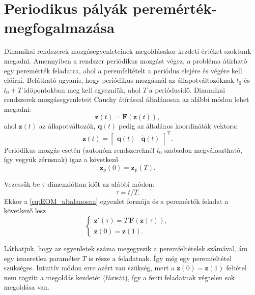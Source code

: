 


\section{Periodikus pályák peremérték-megfogalmazása}
\label{sec:per_palya_perem_megfog}

Dinamikai rendszerek mozgásegyenleteinek megoldásakor kezdeti értéket szoktunk megadni.
Amennyiben a rendszer periódikus mozgást végez, a probléma átírható egy peremérték feladatra, ahol a peremfeltételt a periódus elejére és végére kell előírni.
Belátható ugyanis, hogy periódikus mozgásnál az állapotváltozóknak $t_0$ és $t_0 + T$ időpontokban meg kell egyezniük, ahol $T$ a periódusidő.
Dinamikai rendszerek mozgásegyenleteit Cauchy átírással általánosan az alábbi módon lehet megadni:
\begin{equation}
\dot{\mathbf{z}}(t) = \mathbf{F}(\mathbf{z}(t)),
\label{eq:EOM_altalanosan}
\end{equation}
ahol $\mathbf{z}(t)$ az állapotváltozók, $\mathbf{q}(t)$ pedig az általános koordináták vektora:
\begin{equation}
\mathbf{z}(t) = \begin{bmatrix}
\mathbf{q}(t) & \dot{\mathbf{q}}(t)
\end{bmatrix}^\mathrm{T}.
\end{equation}
Periódikus mozgás esetén (autonóm rendszereknél $t_0$ szabadon megválasztható, így vegyük zérusnak) igaz a következő
\begin{equation}
\mathbf{z}_\mathrm{p}(0) = \mathbf{z}_\mathrm{p}(T) .
\end{equation}

Vezessük be $\tau$ dimenziótlan időt az alábbi módon:
\begin{equation}
\tau =  t/T.
\end{equation}
Ekkor a \eqref{eq:EOM_altalanosan} egyenlet formája és a peremérték feladat a következő lesz
\begin{equation}
\begin{cases}
\mathbf{z}'(\tau) = T\,\mathbf{F}(\mathbf{z}(\tau)), \\
\mathbf{z}(0) = \mathbf{z}(1).
\end{cases}
\label{eq:EOM_dimtalan}
\end{equation}

Láthatjuk, hogy az egyenletek száma megegyezik a peremfeltételek számával, ám egy ismeretlen paraméter $T$ is része a feladatnak. Így még egy peremfeltétel szükséges. Intuitív módon erre azért van szükség, mert a $\mathbf{z}(0) = \mathbf{z}(1)$ feltétel nem rögzíti a megoldás kezdetét (fázisát), így a fenti feladatnak végtelen sok megoldása van.

